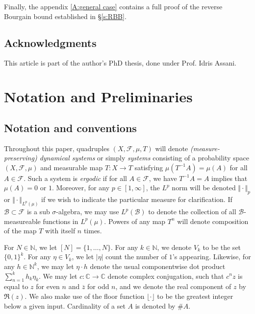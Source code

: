 \documentclass[11pt, oneside]{amsart}   	%
\newcommand{\C}{\mathbb{C}}
\newcommand{\1}{\mathbbm{1}}
\newcommand{\N}{\mathbb{N}}
\newcommand{\floor}[1]{\lfloor#1\rfloor}
\theoremstyle{definition}
\begin{document}
Finally, the appendix \ref{A:general case} contains a full proof of the reverse Bourgain bound established in \S\ref{s:RBB}.



\subsection{Acknowledgments} This article is part of the author's PhD thesis, done under Prof. Idris Assani.

\section{Notation and Preliminaries}\label{S:background}

\subsection{Notation and conventions}\label{S:notation} Throughout this paper, quadruples $(X, \mathcal{F}, \mu, T)$ will denote \textit{(measure-preserving) dynamical systems} or simply \textit{systems} consisting of a probability space $(X, \mathcal{F}, \mu)$ and measurable map $T:X \to T$ satisfying $\mu(T^{-1}A) = \mu(A)$ for all $A\in \mathcal{F}$. Such a system is \textit{ergodic}
if for all $A\in \mathcal{F}$, we have $T^{-1}A = A$ implies that $\mu(A) = 0$ or $1$. Moreover, for any $p\in [1, \infty]$, the $L^p$ norm will be denoted $\Vert \cdot \Vert_p$ or $\Vert \cdot \Vert_{L^p(\mu)}$ if we wish to indicate the particular measure for clarification. If $\mathcal{B}\subset \mathcal{F}$ is a sub $\sigma$-algebra, we may use $L^p(\mathcal{B})$ to denote the collection of all $\mathcal{B}$-measureable functions in $L^p(\mu)$. Powers of any map $T^n$ will denote composition of the map $T$ with itself $n$ times.

For $N\in \N$, we let $[N] = \{1, \dots, N\}$. For any $k\in \N$, we denote $V_k$ to be the set $\{0, 1\}^k$. For any $\eta\in V_k$, we let $|\eta|$ count the number of $1$'s appearing. Likewise, for any $h\in \N^k$, we may let $\eta \cdot h$ denote the usual componentwise dot product $\sum_{n=1}^k h_k \eta_k$. We may let $c:\C \to \C$ denote complex conjugation, such that $c^n z$ is equal to $z$ for even $n$ and $\overline{z}$ for odd $n$, and we denote the real component of $z$ by $\Re(z)$. We also make use of the floor function $\floor{ \cdot }$ to be the greatest integer below a given input. Cardinality of a set $A$ is denoted by $\# A $.
\end{document}
